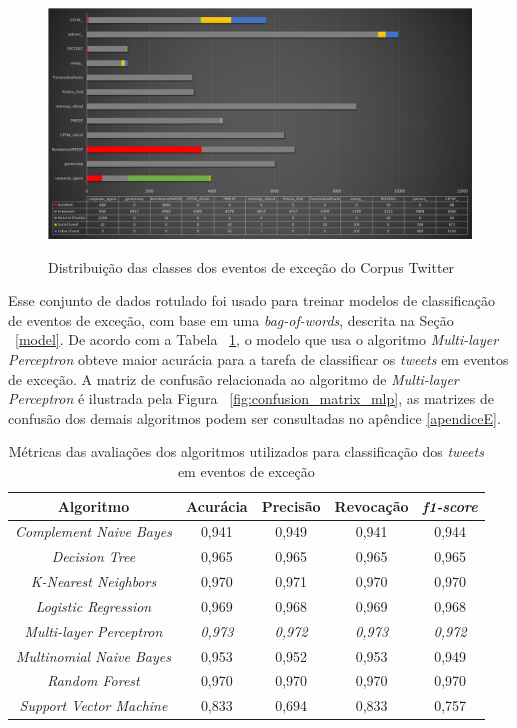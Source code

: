 \documentclass[
	12pt,				%
	oneside,			%
	a4paper,			%
	english,			%
	brazil				%
	]{abntex2ppgsi}
\begin{document}
\begin{figure}[!htb]
	\centering
 	  \caption{Distribuição das classes dos eventos de exceção do Corpus Twitter}
		\includegraphics[width=1\linewidth]{images/tweets_distribution.png}
	\label{fig:tweets_distribution}
\end{figure}

Esse conjunto de dados rotulado foi usado para treinar modelos de classificação de eventos de exceção, com base em uma \textit{bag-of-words}, descrita na Seção ~\ref{model}. De acordo com a Tabela ~\ref{tab:metrics}, o modelo que usa o algoritmo \textit{Multi-layer Perceptron} obteve maior acurácia para a tarefa de classificar os \textit{tweets} em eventos de exceção. A matriz de confusão relacionada ao algoritmo de \textit{Multi-layer Perceptron} é ilustrada pela Figura ~\ref{fig:confusion_matrix_mlp}, as matrizes de confusão dos demais algoritmos podem ser consultadas no apêndice \ref{apendiceE}.

\begin{table}[!htb]
\centering
\caption {Métricas das avaliações dos algoritmos utilizados para classificação dos \textit{tweets} em eventos de exceção}
\label {tab:metrics}
\begin{tabular}{c|c|c|c|c}
\toprule
\textbf{Algoritmo} & \textbf{Acurácia} & \textbf{Precisão} & \textbf{Revocação} & \textbf{\textit{f1-score}} \\
\midrule
\textit{Complement Naive Bayes} & 0,941 & 0,949 & 0,941 & 0,944 \\
\hline
\textit{Decision Tree} & 0,965 & 0,965 & 0,965 & 0,965 \\
\hline
\textit{K-Nearest Neighbors} & 0,970 & 0,971 & 0,970 & 0,970 \\
\hline
\textit{Logistic Regression} & 0,969 & 0,968 & 0,969 & 0,968 \\
\hline
\textit{Multi-layer Perceptron} & \textit{0,973} & \textit{0,972} & \textit{0,973} & \textit{0,972} \\
\hline
\textit{Multinomial Naive Bayes} & 0,953 & 0,952 & 0,953 & 0,949 \\
\hline
\textit{Random Forest} & 0,970 & 0,970 & 0,970 & 0,970 \\
\hline
\textit{Support Vector Machine} & 0,833 & 0,694 & 0,833 & 0,757 \\
\bottomrule
\end{tabular}\end{table}
\end{document}

